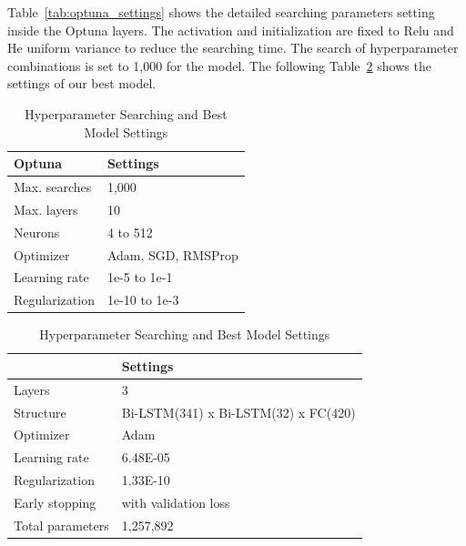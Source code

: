 Table~\ref{tab:optuna_settings} shows the detailed searching parameters setting inside the Optuna layers. 
The activation and initialization are fixed to Relu and He uniform variance to reduce the searching time. 
The search of hyperparameter combinations is set to 1,000 for the model. 
The following Table~\ref{tab:bestmodel} shows the settings of our best model.

\begin{table}[hbt]
    \centering
    \caption{Hyperparameter Searching and Best Model Settings}
    \label{tab:combined_tables}
    \begin{minipage}[t][6cm][t]{\textwidth} %
        \centering
        \label{tab:optuna_settings}
        \begin{tabular}{@{}ll@{}}
            \toprule
            Optuna & Settings \\ \midrule
            Max. searches & 1,000 \\
            Max. layers & 10 \\ 
            Neurons & 4 to 512 \\ 
            Optimizer & Adam, SGD, RMSProp \\ 
            Learning rate & 1e-5 to 1e-1 \\ 
            Regularization & 1e-10 to 1e-3 \\
            \bottomrule
        \end{tabular}
    \end{minipage}
    \hfill
    \begin{minipage}[t][6cm][t]{\textwidth} %
        \centering
        \label{tab:bestmodel}
        \begin{tabular}{@{}ll@{}}
            \toprule
             & Settings \\ \midrule
            Layers & 3 \\
            Structure & Bi-LSTM(341) x Bi-LSTM(32) x FC(420) \\ 
            Optimizer & Adam \\ 
            Learning rate & 6.48E-05 \\ 
            Regularization & 1.33E-10 \\
            Early stopping & with validation loss \\
            Total parameters & 1,257,892 \\
            \bottomrule
        \end{tabular}
    \end{minipage}
\end{table}


